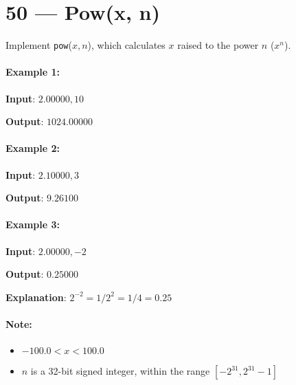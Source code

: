 \section{50 --- Pow(x, n)}
Implement \texttt{pow}($x, n$), which calculates $x$ raised to the power $n$ ($x^n$).

\paragraph{Example 1:}

\begin{flushleft}
\textbf{Input}: $2.00000, 10$

\textbf{Output}: $1024.00000$
\end{flushleft}

\paragraph{Example 2:}

\begin{flushleft}
\textbf{Input}: $2.10000, 3$

\textbf{Output}: $9.26100$
\end{flushleft}

\paragraph{Example 3:}

\begin{flushleft}
\textbf{Input}: $2.00000, -2$

\textbf{Output}: $0.25000$

\textbf{Explanation}: $2^{-2} = 1/2^2 = 1/4 = 0.25$
\end{flushleft}


\paragraph{Note:}

\begin{itemize}
\item $-100.0 < x < 100.0$
\item $n$ is a 32-bit signed integer, within the range $[−2^{31}, 2^{31} − 1]$
\end{itemize}

